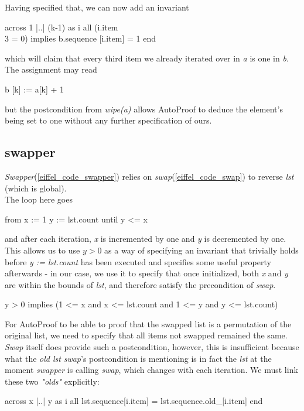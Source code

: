 Having specified that, we can now add an invariant
\begin{eSimple}
across 1 |..| (k-1) as i all
	(i.item \\ 3 = 0) implies
		b.sequence [i.item] = 1 end
\end{eSimple}
which will claim that every third item we already iterated over in \emph{a} is one in \emph{b}. The assignment may read
\begin{eSimple}
b [k] := a[k] + 1
\end{eSimple}
but the postcondition from \emph{wipe(a)} allows AutoProof to deduce the element's being set to one without any further specification of ours.\\

\subsection{swapper}
\emph{Swapper}(\ref{eiffel_code_swapper}) relies on \emph{swap}(\ref{eiffel_code_swap}) to reverse \emph{lst} (which is global).\\

The loop here goes
\begin{eSimple}
from
	x := 1
	y := lst.count
until
	y <= x
\end{eSimple}

and after each iteration, \emph{x} is incremented by one and \emph{y} is decremented by one. 
This allows us to use $y > 0$ as a way of specifying an invariant that trivially holds before \emph{y := lst.count} has been executed and specifies some useful property afterwards - in our case, we use it to specify that once initialized, both \emph{x} and \emph{y} are within the bounds of \emph{lst}, and therefore satisfy the precondition of \emph{swap}.
\begin{eSimple}
y > 0 implies (1 <= x and x <= lst.count and 1 <= y and y <= lst.count)
\end{eSimple}

For AutoProof to be able to proof that the swapped list is a permutation of the original list, we need to specify that all items not swapped remained the same. 
\emph{Swap} itself does provide such a postcondition, however, this is insufficient because what the \emph{old lst} \emph{swap}'s postcondition is mentioning is in fact the \emph{lst} at the moment \emph{swapper} is calling \emph{swap}, which changes with each iteration. We must link these two \emph{"olds"} explicitly:
\begin{eSimple}
across x |..| y as i all lst.sequence[i.item] =
	lst.sequence.old_[i.item] end
\end{eSimple}

